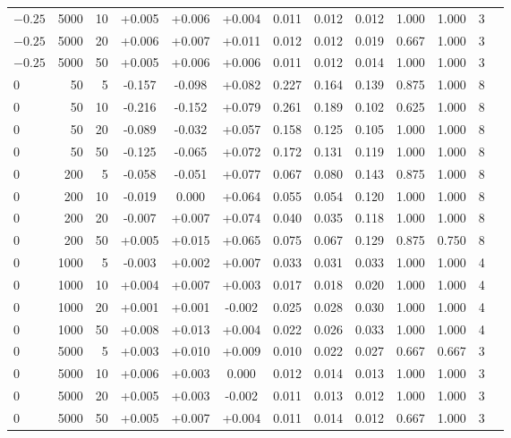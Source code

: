 \begin{table}[t]
\begin{adjustbox}{max width=\textwidth}
\begin{tabular}{lrr *{3}{ccc} c}
$-0.25$ & 5000 &   10 & +0.005 & +0.006 & +0.004 & 0.011 & 0.012 & 0.012 & 1.000 & 1.000 &    3 \\
$-0.25$ & 5000 &   20 & +0.006 & +0.007 & +0.011 & 0.012 & 0.012 & 0.019 & 0.667 & 1.000 &    3 \\
$-0.25$ & 5000 &   50 & +0.005 & +0.006 & +0.006 & 0.011 & 0.012 & 0.014 & 1.000 & 1.000 &    3 \\
\midrule
$0$ &   50 &    5 & -0.157 & -0.098 & +0.082 & 0.227 & 0.164 & 0.139 & 0.875 & 1.000 &    8 \\
$0$ &   50 &   10 & -0.216 & -0.152 & +0.079 & 0.261 & 0.189 & 0.102 & 0.625 & 1.000 &    8 \\
$0$ &   50 &   20 & -0.089 & -0.032 & +0.057 & 0.158 & 0.125 & 0.105 & 1.000 & 1.000 &    8 \\
$0$ &   50 &   50 & -0.125 & -0.065 & +0.072 & 0.172 & 0.131 & 0.119 & 1.000 & 1.000 &    8 \\
$0$ &  200 &    5 & -0.058 & -0.051 & +0.077 & 0.067 & 0.080 & 0.143 & 0.875 & 1.000 &    8 \\
$0$ &  200 &   10 & -0.019 & 0.000 & +0.064 & 0.055 & 0.054 & 0.120 & 1.000 & 1.000 &    8 \\
$0$ &  200 &   20 & -0.007 & +0.007 & +0.074 & 0.040 & 0.035 & 0.118 & 1.000 & 1.000 &    8 \\
$0$ &  200 &   50 & +0.005 & +0.015 & +0.065 & 0.075 & 0.067 & 0.129 & 0.875 & 0.750 &    8 \\
$0$ & 1000 &    5 & -0.003 & +0.002 & +0.007 & 0.033 & 0.031 & 0.033 & 1.000 & 1.000 &    4 \\
$0$ & 1000 &   10 & +0.004 & +0.007 & +0.003 & 0.017 & 0.018 & 0.020 & 1.000 & 1.000 &    4 \\
$0$ & 1000 &   20 & +0.001 & +0.001 & -0.002 & 0.025 & 0.028 & 0.030 & 1.000 & 1.000 &    4 \\
$0$ & 1000 &   50 & +0.008 & +0.013 & +0.004 & 0.022 & 0.026 & 0.033 & 1.000 & 1.000 &    4 \\
$0$ & 5000 &    5 & +0.003 & +0.010 & +0.009 & 0.010 & 0.022 & 0.027 & 0.667 & 0.667 &    3 \\
$0$ & 5000 &   10 & +0.006 & +0.003 & 0.000 & 0.012 & 0.014 & 0.013 & 1.000 & 1.000 &    3 \\
$0$ & 5000 &   20 & +0.005 & +0.003 & -0.002 & 0.011 & 0.013 & 0.012 & 1.000 & 1.000 &    3 \\
$0$ & 5000 &   50 & +0.005 & +0.007 & +0.004 & 0.011 & 0.014 & 0.012 & 0.667 & 1.000 &    3 \\
\bottomrule
\end{tabular}
\end{adjustbox}
\end{table}